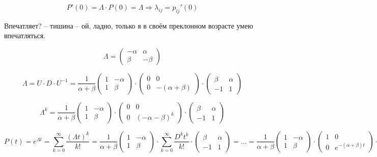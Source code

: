 \begin{corollary}
  \[
    P'(0) = \Lambda \cdot P(0) = \Lambda
    \Rightarrow
    \lambda_{ij} = p_{ij}' (0)
  \]
\end{corollary}

Впечатляет? -- тишина -- ой, ладно, только я в своём преклонном возрасте умею впечатляться.

\begin{ex}
  \[
    \Lambda = \begin{pmatrix}
      -\alpha & \alpha \\
      \beta & -\beta
    \end{pmatrix} 
  \]

  \[
    \Lambda = U \cdot D \cdot U^{-1}
    = \dfrac{1}{\alpha+\beta} \begin{pmatrix}
      1 & -\alpha \\
      1 & \beta
    \end{pmatrix}  \cdot \begin{pmatrix}
      0 & 0 \\
      0 & - (\alpha+\beta)
    \end{pmatrix} \cdot \begin{pmatrix}
      \beta & \alpha \\
      -1 & 1
    \end{pmatrix} 
  \]

  \[
    \Lambda^k = \dfrac{1}{\alpha+\beta} \begin{pmatrix}
      1 & -\alpha \\
      1 & \beta
    \end{pmatrix} \cdot \begin{pmatrix}
      0 & 0 \\
      0 & (-\alpha-\beta)^k
    \end{pmatrix} \cdot \begin{pmatrix}
      \beta & \alpha \\
      -1 & 1
    \end{pmatrix} 
  \]

  \[
    P(t) = e^{\Lambda t} = \sum_{k=0}^\infty \dfrac{(\Lambda t)^k}{k!}
    = \dfrac{1}{\alpha+\beta} \begin{pmatrix}
      1 & -\alpha \\
      1 & \beta
    \end{pmatrix}  \cdot
    \sum_{k=0}^\infty \dfrac{D^k t^k}{k!} \cdot
    \begin{pmatrix}
      \beta & \alpha \\
      -1 & 1
    \end{pmatrix} = \dots = \dfrac{1}{\alpha+\beta} \begin{pmatrix}
      1 & -\alpha \\
      1 & \beta
    \end{pmatrix}  \cdot
    \begin{pmatrix}
      1 & 0 \\
      0 & e^{-(\alpha+\beta) t}
    \end{pmatrix} \cdot \begin{pmatrix}
      \beta & \alpha \\
      -1 & 1
    \end{pmatrix} 
  \]


\end{ex}
